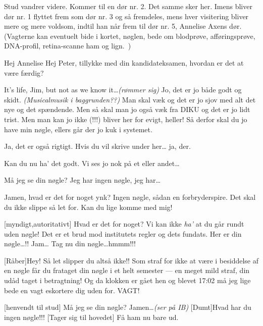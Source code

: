 \documentclass[10pt]{article}
\begin{document}
\begin{sketch}
\scene Stud vandrer videre. Kommer til en dør nr. 2. Det samme sker her.
  Imens bliver dør nr. 1 flyttet frem som dør nr. 3 og så fremdeles, mens
  hver visitering bliver mere og mere voldsom, indtil
  han når frem til dør nr. 5, Annelise Axens dør. (Vagterne kan eventuelt
  bide i kortet, nøglen, bede om blodprøve, afføringsprøve, DNA-profil,
  retina-scanne ham og lign.\ ) 

Hej Annelise
Hej Peter, tillykke med din kandidateksamen, hvordan er det
at være færdig?

It's life, Jim, but not as we know it\ldots{\em (rømmer sig)}
Jo, det er jo både godt og skidt. {\em (Musicalmusik i baggrunden??)} Man
skal væk og det er jo sjov med alt det nye og det spændende. Men så skal
man jo også væk fra DIKU og det er jo lidt trist. Men man kan jo ikke (!!!)
bliver her for evigt, heller!  Så derfor skal du jo have min nøgle, ellers
går der jo kuk i systemet.

Ja, det er også rigtigt. Hvis du vil skrive under her\ldots
ja, der.

Kan du nu ha' det godt. Vi ses jo nok på et eller andet\ldots


 Må jeg se din nøgle?
 Jeg har ingen nøgle, jeg har\ldots

 Jamen, hvad er det for noget ynk? Ingen nøgle, sådan en
forbryderspire. Det skal du ikke slippe så let for. Kan du lige komme med
mig!

[myndigt,autoritativt] Hvad er det for noget? Vi kan ikke {\em ha'} at du går rundt uden
nøgle! Det er et brud mod institutets regler og dets fundats. Her er din
nøgle\ldots!!
 Jam\ldots
{} Tag nu din nøgle\ldots hmmm!!!

 [Råber]Hey! Så let slipper du altså ikke!! Som straf for ikke at
være i besiddelse af en nøgle får du frataget din nøgle i et helt semester
--- en meget mild straf, din udåd taget i betragtning! Og da klokken er
gået hen og blevet 17:02 må jeg lige bede en vagt eskortere dig uden for.
VAGT!

[henvendt til stud] Må jeg se din nøgle?
Jamen\ldots {\em (ser på IB)}
[Dumt]Hvad har du ingen nøgle!!!
[Tager sig til hovedet] Få ham nu bare ud.


\end{sketch}
\end{document}
